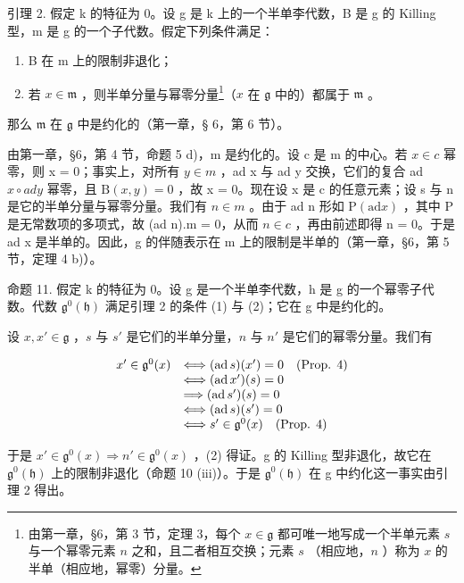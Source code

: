 引理 2. 假定 k 的特征为 0。设 g 是 k 上的一个半单李代数，B 是 g 的 Killing 型，m 是 g 的一个子代数。假定下列条件满足：

\begin{enumerate}
\def\labelenumi{\arabic{enumi})}
\item
  B 在 m 上的限制非退化；
\item
  若 \(x \in \mathfrak{m}\) ，则半单分量与幂零分量\footnote{由第一章，§6，第 3 节，定理 3，每个 \(x \in \mathfrak{g}\) 都可唯一地写成一个半单元素 \(s\) 与一个幂零元素 \(n\) 之和，且二者相互交换；元素 \(s\) （相应地，\(n\) ）称为 \(x\) 的半单（相应地，幂零）分量。}（\(x\) 在 \(\mathfrak{g}\) 中的）都属于 \(\mathfrak{m}\) 。
\end{enumerate}

那么 \(\mathfrak{m}\) 在 \(\mathfrak{g}\) 中是约化的（第一章，§ 6，第 6 节）。

由第一章，§6，第 4 节，命题 5 d)，m 是约化的。设 c 是 m 的中心。若 \(x \in c\) 幂零，则 x = 0；事实上，对所有 \(y \in m\) ，ad x 与 ad y 交换，它们的复合 ad \(x \circ ad y\) 幂零，且 \(\mathrm{B}(x, y) = 0\) ，故 x = 0。现在设 x 是 c 的任意元素；设 s 与 n 是它的半单分量与幂零分量。我们有 \(n \in m\) 。由于 ad n 形如 \(\mathrm{P}(\mathrm{ad}x)\) ，其中 P 是无常数项的多项式，故 (ad n).m = 0，从而 \(n \in c\) ，再由前述即得 n = 0。于是 ad x 是半单的。因此，g 的伴随表示在 m 上的限制是半单的（第一章，§6，第 5 节，定理 4 b)）。

命题 11. 假定 k 的特征为 0。设 g 是一个半单李代数，h 是 g 的一个幂零子代数。代数 \(\mathfrak{g}^{0}(\mathfrak{h})\) 满足引理 2 的条件 (1) 与 (2)；它在 g 中是约化的。

设 \(x, x' \in \mathfrak{g}\) ，\(s\) 与 \(s'\) 是它们的半单分量，\(n\) 与 \(n'\) 是它们的幂零分量。我们有

\[
\begin{array}{r l} x ^ {\prime} \in \mathfrak {g} ^ {0} (x) & \Longleftrightarrow (\operatorname{ad} s) (x ^ {\prime}) = 0 \quad \text {(Prop. 4)} \\ & \Longleftrightarrow (\operatorname{ad} x ^ {\prime}) (s) = 0 \\ & \Longrightarrow (\operatorname{ad} s ^ {\prime}) (s) = 0 \\ & \Longleftrightarrow (\operatorname{ad} s) (s ^ {\prime}) = 0 \\ & \Longleftrightarrow s ^ {\prime} \in \mathfrak {g} ^ {0} (x) \quad \text {(Prop. 4)} \end{array}
\]

于是 \(x' \in \mathfrak{g}^{0}(x) \Rightarrow n' \in \mathfrak{g}^{0}(x)\) ，(2) 得证。g 的 Killing 型非退化，故它在 \(\mathfrak{g}^{0}(\mathfrak{h})\) 上的限制非退化（命题 10 (iii)）。于是 \(\mathfrak{g}^{0}(\mathfrak{h})\) 在 g 中约化这一事实由引理 2 得出。

